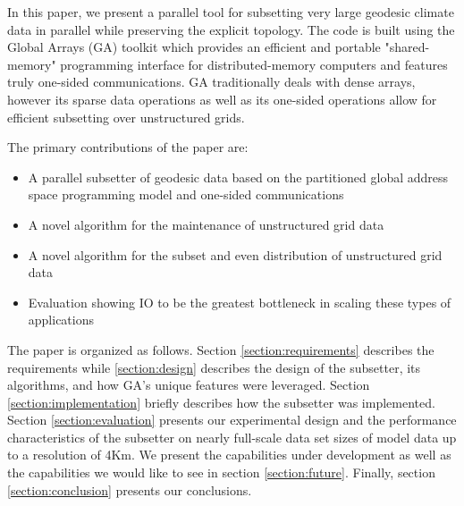 In this paper, we present a parallel tool for subsetting very large geodesic
climate data in parallel while preserving the explicit topology.  The code is
built using the Global Arrays (GA) toolkit which provides an efficient and
portable "shared-memory" programming interface for distributed-memory
computers and features truly one-sided communications.\cite{GA}  GA
traditionally deals with dense arrays, however its sparse data operations as
well as its one-sided operations allow for efficient subsetting over
unstructured grids.

The primary contributions of the paper are:
\begin{itemize}
\item A parallel subsetter of geodesic data based on the partitioned global address space programming model and one-sided communications
\item A novel algorithm for the maintenance of unstructured grid data
\item A novel algorithm for the subset and even distribution of unstructured grid data
\item Evaluation showing IO to be the greatest bottleneck in scaling these types of applications
\end{itemize}

The paper is organized as follows.  Section \ref{section:requirements}
describes the requirements while \ref{section:design} describes the design of
the subsetter, its algorithms, and how GA's unique features were leveraged.
Section \ref{section:implementation} briefly describes how the subsetter was
implemented.  Section \ref{section:evaluation} presents our experimental design
and the performance characteristics of the subsetter on nearly full-scale data
set sizes of model data up to a resolution of 4Km.  We present the
capabilities under development as well as the capabilities we would like to
see in section \ref{section:future}.  Finally, section
\ref{section:conclusion} presents our conclusions.
